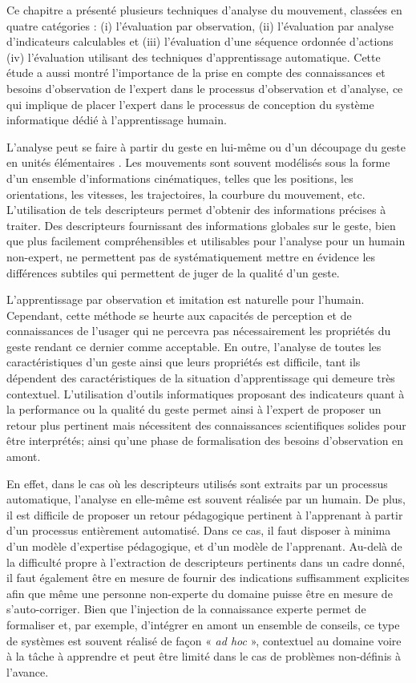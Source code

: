 Ce chapitre a présenté plusieurs techniques d'analyse du mouvement, classées en quatre catégories : (i) l'évaluation par observation, (ii) l'évaluation par analyse d'indicateurs calculables  et (iii) l'évaluation d'une séquence ordonnée d'actions (iv) l'évaluation utilisant des techniques d'apprentissage automatique. Cette étude a aussi montré l'importance de la prise en compte des connaissances et besoins d'observation de l'expert dans le processus d'observation et d'analyse, ce qui implique de placer l'expert dans le processus de conception du système informatique dédié à l'apprentissage humain.

L'analyse peut se faire à partir du geste en lui-même ou d'un découpage du geste en unités élémentaires \parencite{Despinoy2016UTS} \parencite{Yamaoka2013FoF} \parencite{Pirsiavash2014AQA}. Les mouvements sont souvent modélisés sous la forme d'un ensemble d'informations cinématiques, telles que les positions, les orientations, les vitesses, les trajectoires, la courbure du mouvement, etc. L'utilisation de tels descripteurs permet d'obtenir des informations précises à traiter. Des descripteurs fournissant des informations globales sur le geste, bien que plus facilement compréhensibles et utilisables pour l'analyse pour un humain non-expert, ne permettent pas de systématiquement mettre en évidence les différences subtiles qui permettent de juger de la qualité d'un geste.

L'apprentissage par observation et imitation est naturelle pour l'humain. Cependant, cette méthode se heurte aux capacités de perception et de connaissances de l'usager qui ne percevra pas nécessairement les propriétés du geste rendant ce dernier comme acceptable. En outre, l'analyse de toutes les caractéristiques d'un geste ainsi que leurs propriétés est difficile, tant ils dépendent des caractéristiques de la situation d'apprentissage qui demeure très contextuel. L'utilisation d'outils informatiques proposant des indicateurs quant à la performance ou la qualité du geste permet ainsi à l'expert de proposer un retour plus pertinent mais nécessitent des connaissances scientifiques solides pour être interprétés; ainsi qu'une phase de formalisation des besoins d'observation en amont.

En effet, dans le cas où les descripteurs utilisés sont extraits par un processus automatique, l'analyse en elle-même est souvent réalisée par un humain. De plus, il est difficile de proposer un retour pédagogique pertinent à l'apprenant à partir d'un processus entièrement automatisé. Dans ce cas, il faut disposer à minima d'un modèle d'expertise pédagogique, et d'un modèle de l'apprenant. Au-delà de la difficulté propre à l'extraction de descripteurs pertinents dans un cadre donné, il faut également être en mesure de fournir des indications suffisamment explicites afin que même une personne non-experte du domaine puisse être en mesure de s'auto-corriger. Bien que l'injection de la connaissance experte permet de formaliser et, par exemple, d'intégrer en amont un ensemble de conseils, ce type de systèmes est souvent réalisé de façon « \textit{ad hoc} », contextuel au domaine voire à la tâche à apprendre et peut être limité dans le cas de problèmes non-définis à l'avance.

